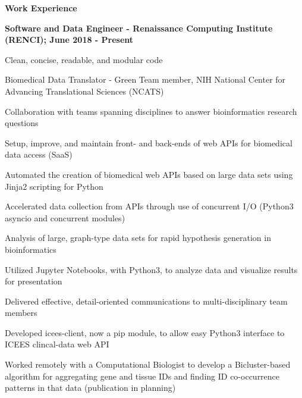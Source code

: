 \documentclass[letterpaper,final]{memoir}
\newcommand{\LargeSep}{\vspace{1.3em}}
\newcommand{\Sep}{\vspace{1.0em}}
\newcommand{\SmallSep}{\vspace{0.4em}}
\newcommand{\CVSection}[1]
	{\LARGE\textbf{#1}\par
	\SmallSep\normalsize}
\newcommand{\CVItem}[1]
	{\textbf{\color{Blue} #1}}
\begin{document}
\LargeSep


\notoserif \CVSection{Work Experience}
\normalfont

\Sep

\CVItem{Software and Data Engineer - Renaissance Computing Institute (RENCI); June 2018 - Present}
\begin{compactitem}[\color{Blue}$\circ$]
    
    \SmallSep
    \item Clean, concise, readable, and modular code
    
    \item Biomedical Data Translator - Green Team member, NIH National Center for Advancing Translational Sciences (NCATS)
    
    \item Collaboration with teams spanning disciplines to answer bioinformatics research questions
    
    \item Setup, improve, and maintain front- and back-ends of web APIs for biomedical data access (SaaS)
    
    \item Automated the creation of biomedical web APIs based on large data sets using Jinja2 scripting for Python
    
    \item Accelerated data collection from APIs through use of concurrent I/O (Python3 asyncio and concurrent modules)
    
    \item Analysis of large, graph-type data sets for rapid hypothesis generation in bioinformatics
    
    \item Utilized Jupyter Notebooks, with Python3, to analyze data and visualize results for presentation
    
    \item Delivered effective, detail-oriented communications to multi-disciplinary team members
    
    \item Developed icees-client, now a pip module, to allow easy Python3 interface to ICEES clincal-data web API
    
    \item Worked remotely with a Computational Biologist to develop a Bicluster-based algorithm for 
        aggregating gene and tissue IDs and finding ID co-occurrence patterns in that data (publication in planning) 

\end{compactitem}
\end{document}
